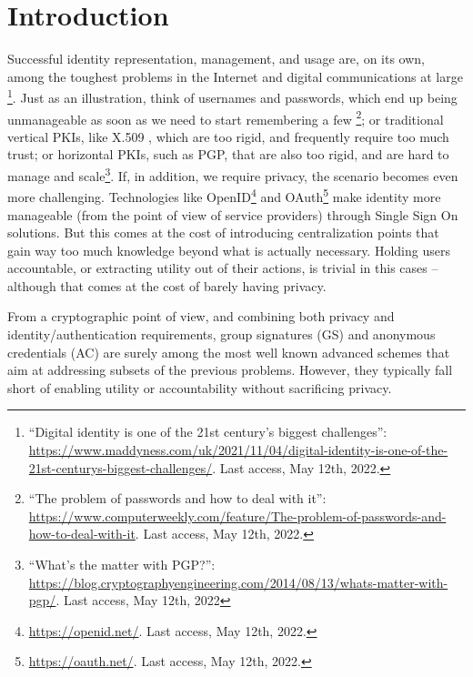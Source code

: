 \section{Introduction}
\label{sec:introduction}

Successful identity representation, management, and usage are, on its own, among
the toughest problems in the Internet and digital communications at large%
\footnote{``Digital identity is one of the 21st century's biggest challenges'':
  \url{https://www.maddyness.com/uk/2021/11/04/digital-identity-is-one-of-the-21st-centurys-biggest-challenges/}. Last access, May 12th, 2022.}.
Just as an illustration, think
of usernames and passwords, which end up being unmanageable as soon as we need
to start remembering a few%
\footnote{``The problem of passwords and how to deal with it'': \url{https://www.computerweekly.com/feature/The-problem-of-passwords-and-how-to-deal-with-it}. Last access,
May 12th, 2022.}; or traditional vertical PKIs, like X.509 \cite{rfc5280},
which are too rigid, and frequently require too much trust; or
horizontal PKIs, such as PGP, that are also too rigid, and are hard to manage
and scale\footnote{``What's the matter with PGP?'': \url{https://blog.cryptographyengineering.com/2014/08/13/whats-matter-with-pgp/}. Last access, May 12th, 2022}.
If, in addition, we require privacy, the scenario becomes even more
challenging. Technologies like OpenID\footnote{\url{https://openid.net/}. Last
  access, May 12th, 2022.} and OAuth\footnote{\url{https://oauth.net/}. Last
  access, May 12th, 2022.} make identity more
manageable (from the point of view of service providers) through Single Sign
On solutions. But this comes at the cost of introducing centralization points
that gain way too much knowledge beyond what is actually necessary. Holding
users accountable, or extracting utility out of their actions, is trivial in
this cases -- although that comes at the cost of barely having privacy.


From a cryptographic point of view, and combining both privacy and
identity/authentication requirements, group signatures (GS) and anonymous
credentials (AC) are surely among the most well known advanced schemes that
aim at addressing subsets of the previous problems. However, they typically fall
short of enabling utility or accountability without sacrificing privacy.

